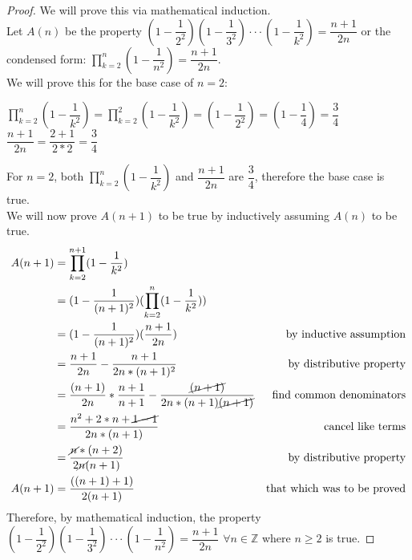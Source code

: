 \documentclass{article}
\begin{document}
\begin{proof}
	We will prove this via mathematical induction. \\
	Let $A(n)$ be the property $(1-\dfrac{1}{2^2})(1-\dfrac{1}{3^2})\cdot \cdot \cdot (1-\dfrac{1}{k^2})=\dfrac{n+1}{2n}$ or the condensed form: $\prod\limits_{k=2}^{n}(1-\dfrac{1}{n^2})= \dfrac{n+1}{2n}$. \\
	We will prove this for the base case of $n=2$: 
	\begin{center}
		$\prod\limits_{k=2}^{n}(1-\dfrac{1}{k^2}) = \prod\limits_{k=2}^{2}(1-\dfrac{1}{k^2}) = 
		(1-\dfrac{1}{2^2}) = (1-\dfrac{1}{4}) = \dfrac{3}{4}$ \\
		$\dfrac{n+1}{2n} = \dfrac{2+1}{2*2} = \dfrac{3}{4}$ \\
	\end{center}
	For $n=2$, both $\prod\limits_{k=2}^{n}(1-\dfrac{1}{k^2})$ and $\dfrac{n+1}{2n}$ are $\dfrac{3}{4}$, therefore the base case is true. \\
	We will now prove $A(n+1)$ to be true by inductively assuming $A(n)$ to be true.
	\begin{align*}
		A(n+1) &= \prod\limits_{k=2}^{n+1}(1-\dfrac{1}{k^2}) \\
		&=(1-\dfrac{1}{(n+1)^2})(\prod\limits_{k=2}^{n}(1-\dfrac{1}{k^2})) \\
		&=(1-\dfrac{1}{(n+1)^2})(\dfrac{n+1}{2n}) &\text{by inductive assumption} \\
		&=\dfrac{n+1}{2n} - \dfrac{n+1}{2n*(n+1)^2} &\text{by distributive property} \\
		&=\dfrac{(n+1)}{2n}*\dfrac{n+1}{n+1} - \dfrac{\cancel{(n+1)}}{2n*(n+1)\cancel{(n+1)}} &\text{find common denominators}\\
		&=\dfrac{n^2+2*n+\cancel{1-1}}{2n*(n+1)} &\text{cancel like terms}\\
		&=\dfrac{\cancel{n}*(n+2)}{2\cancel{n}(n+1)} &\text{by distributive property} \\
		A(n+1)&=\dfrac{((n+1)+1)}{2(n+1)} &\text{that which was to be proved}\\
	\end{align*}
	Therefore, by mathematical induction, the property $(1-\dfrac{1}{2^2})(1-\dfrac{1}{3^2})\cdot \cdot \cdot (1-\dfrac{1}{n^2})= \dfrac{n+1}{2n}$ $\forall n \in \mathbb{Z}$ where $n \geq 2$ is true.
\end{proof}

\clearpage
\header
\end{document}
